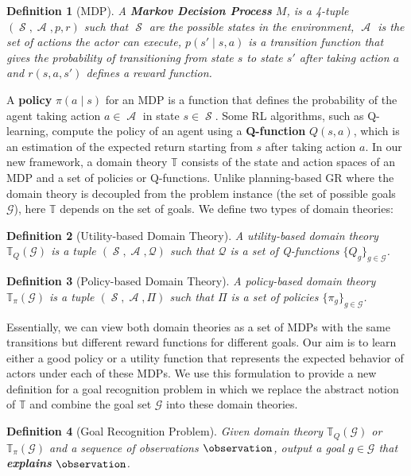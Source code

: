 \documentclass[letterpaper]{article} %
\DeclareMathOperator{\statespace}{\mathcal{S}}
\DeclareMathOperator{\actionspace}{\mathcal{A}}
\providecommand\theory{\mathbb{T}}
\providecommand\goals{\mathcal{G}}
\newtheorem{definition}{Definition}
\begin{document}
\begin{definition}[MDP]
A \textbf{Markov Decision Process} $M$, is a 4-tuple $(\statespace, \actionspace, p, r)$ such that $\statespace$ are the possible states in the environment, $\actionspace$ is the set of actions the actor can execute, $p(s' \mid s, a)$ is a transition function that gives the probability of transitioning from state $s$ to state $s'$ after taking action $a$ and $r(s, a, s')$ defines a reward function.
\end{definition}

A \textbf{policy} $\pi(a \mid s)$ for an MDP is a function that defines the probability of the agent taking action $a \in \actionspace$ in state $s \in \statespace$.
Some RL algorithms, such as Q-learning, compute the policy of an agent using a \textbf{Q-function} $Q(s,a)$, which is an estimation of the expected return starting from $s$ after taking action $a$. %
In our new framework, a domain theory $\theory$ consists of the state and action spaces of an MDP and a set of policies or Q-functions.
Unlike planning-based GR where the domain theory is decoupled from the problem instance (the set of possible goals $\goals$), here $\theory$ depends on the set of goals.
We define two types of domain theories:

\begin{definition}[Utility-based Domain Theory]
A utility-ba\-sed domain theory $\theory_Q(\goals)$ is a tuple $(\statespace, \actionspace, \mathcal{Q})$ such that $\mathcal{Q}$ is a set of Q-functions $\{Q_g\}_{g \in \goals}$.
\end{definition}

\begin{definition}[Policy-based Domain Theory]
A policy-ba\-sed domain theory $\theory_{\pi}(\goals)$ is a tuple $(\statespace, \actionspace, \Pi)$ such that $\Pi$ is a set of policies $\{\pi_g\}_{g \in \goals}$.
\end{definition}

Essentially, we can view both domain theories as a set of MDPs with the same transitions but different reward functions for different goals.
Our aim is to learn either a good policy or a utility function that represents the expected behavior of actors under each of these MDPs.
We use this formulation to provide a new definition for a goal recognition problem in which we replace the abstract notion of $\theory$ and combine the goal set $\goals$ into these domain theories.

\begin{definition}[Goal Recognition Problem]
%
%
%
Given domain theory $\theory_Q(\goals)$ or $\theory_{\pi}(\goals)$ and a sequence of observations $\observation$, output a goal $g\in \goals$ that \textbf{explains} $\observation$.
\end{definition}
\end{document}
